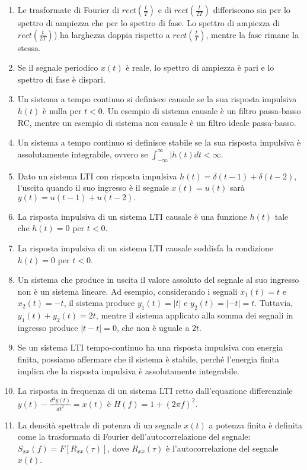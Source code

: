 \documentclass[
]{article}
\begin{document}
\begin{enumerate}
	\item
	Le trasformate di Fourier di \(rect(\frac{t}{T})\) e di
	\(rect(\frac{t}{2T})\) differiscono sia per lo spettro di ampiezza che
	per lo spettro di fase. Lo spettro di ampiezza di
	\(rect(\frac{t}{2T})\)) ha larghezza doppia rispetto a
	\(rect(\frac{t}{T})\), mentre la fase rimane la stessa.
	\item
	Se il segnale periodico \(x(t)\) è reale, lo spettro di ampiezza è
	pari e lo spettro di fase è dispari.
	\item
	Un sistema a tempo continuo si definisce causale se la sua risposta
	impulsiva \(h(t)\) è nulla per \(t < 0\). Un esempio di sistema
	causale è un filtro passa-basso RC, mentre un esempio di sistema non
	causale è un filtro ideale passa-basso.
	\item
	Un sistema a tempo continuo si definisce stabile se la sua risposta
	impulsiva è assolutamente integrabile, ovvero se
	\(\int_{-\infty}^\infty |h(t) dt < \infty\).
	\item
	Dato un sistema LTI con risposta impulsiva
	\(h(t) = \delta(t - 1) + \delta(t - 2)\), l'uscita quando il suo
	ingresso è il segnale \(x(t) = u(t)\) sarà
	\(y(t) = u(t - 1) + u(t - 2).\)
	\item
	La risposta impulsiva di un sistema LTI causale è una funzione
	\(h(t)\) tale che \(h(t) = 0\) per \(t < 0\).
	\item
	La risposta impulsiva di un sistema LTI causale soddisfa la condizione
	\(h(t) = 0\) per \(t < 0\).
	\item
	Un sistema che produce in uscita il valore assoluto del segnale al suo
	ingresso non è un sistema lineare. Ad esempio, considerando i segnali
	\(x_1(t) = t\) e \(x_2(t) = -t\), il sistema produce \(y_1(t) = |t|\)
	e \(y_2(t) = |-t| = t\). Tuttavia, \(y_1(t) + y_2(t) = 2t\), mentre il
	sistema applicato alla somma dei segnali in ingresso produce
	\(|t - t| = 0\), che non è uguale a \(2t\).
	\item
	Se un sistema LTI tempo-continuo ha una risposta impulsiva con energia
	finita, possiamo affermare che il sistema è stabile, perché l'energia
	finita implica che la risposta impulsiva è assolutamente integrabile.
	\item
	La risposta in frequenza di un sistema LTI retto dall'equazione
	differenziale \(y(t) - \frac{d^{2}y(t)}{dt^2} = x(t)\) è
	\(H(f) = 1 + (2 \pi f)^2\).
	\item
	La densità spettrale di potenza di un segnale \(x(t)\) a potenza
	finita è definita come la trasformata di Fourier dell'autocorrelazione
	del segnale: \(S_{xx}(f) = F[R_{xx}(\tau)]\), dove \(R_{xx}(\tau)\) è
	l'autocorrelazione del segnale \(x(t)\).
\end{enumerate}
\end{document}
